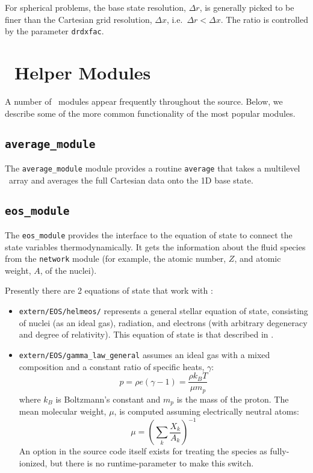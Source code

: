 For spherical problems, the base state resolution, $\Delta r$, is
generally picked to be finer than the Cartesian grid resolution,
$\Delta x$, i.e.\ $\Delta r < \Delta x$.  The ratio is controlled
by the parameter {\tt drdxfac}.



\section{\maestro\ Helper Modules}

A number of \maestro\ modules appear frequently throughout the source.
Below, we describe some of the more common functionality of the most
popular modules.

\subsection{\tt average\_module}

The {\tt average\_module} module provides a routine {\tt average} that takes
a multilevel \multifab\ array and averages the full Cartesian data
onto the 1D base state.

\subsection{{\tt eos\_module}}

The {\tt eos\_module} provides the interface to the equation of 
state to connect the state variables thermodynamically.  It 
gets the information about the fluid species from the {\tt network}
module (for example, the atomic number, $Z$, and atomic weight, $A$,
of the nuclei).

Presently there are 2 equations of state that work with \maestro:
\begin{itemize}
\item {\tt extern/EOS/helmeos/} represents a general stellar equation 
      of state, consisting of nuclei (as an ideal gas), radiation,
      and electrons (with arbitrary degeneracy and degree of relativity).
      This equation of state is that described in \cite{timmes_eos}.

\item {\tt extern/EOS/gamma\_law\_general} assumes an ideal gas with a mixed 
     composition and a constant ratio of specific heats, $\gamma$:
      \begin{equation}
      p = \rho e (\gamma - 1) = \frac{\rho k_B T}{\mu m_p} 
      \end{equation}
     where $k_B$ is Boltzmann's constant and $m_p$ is the mass of the
     proton.
     The mean molecular weight, $\mu$, is computed assuming 
     electrically neutral atoms:
     \begin{equation}
     \mu = \left ( \sum_k \frac{X_k}{A_k} \right )^{-1}
     \end{equation}
     An option in the source code itself exists for treating the
     species as fully-ionized, but there is no runtime-parameter to
     make this switch.
\end{itemize}

